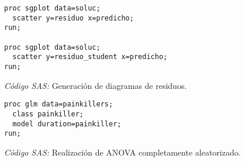 \documentclass[11pt]{article}
\begin{document}
    \begin{figure}[H]
      \centering
      \begin{verbatim}
proc sgplot data=soluc;
  scatter y=residuo x=predicho;
run;

proc sgplot data=soluc;
  scatter y=residuo_student x=predicho;
run;
      \end{verbatim}
      \caption{\emph{Código SAS:} Generación de diagramas de residuos.}
      \label{code:sas_4}
    \end{figure}
    \begin{figure}[H]
      \centering
      \begin{verbatim}
proc glm data=painkillers;
  class painkiller;
  model duration=painkiller;
run;
      \end{verbatim}
      \caption{\emph{Código SAS:} Realización de ANOVA completamente aleatorizado.}
      \label{code:sas_5}
    \end{figure}

  \nocite{rano2017}
  \nocite{sas}

  
  
\end{document}
